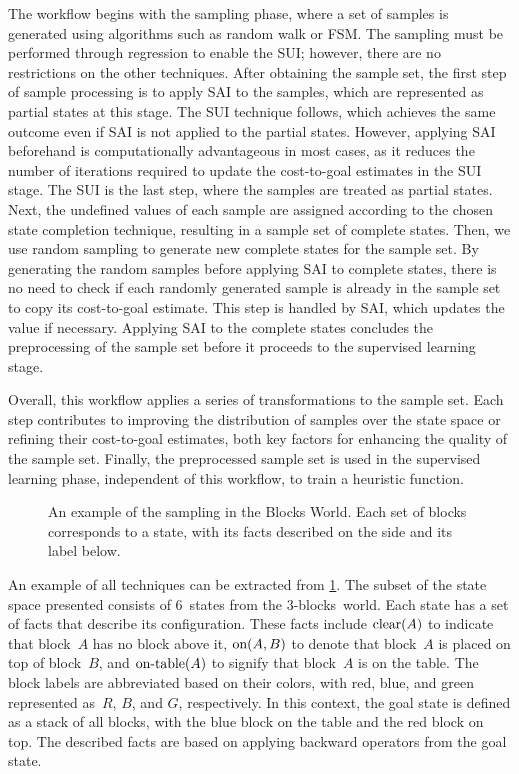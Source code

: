 The workflow begins with the sampling phase, where a set of samples is generated using algorithms such as random walk or FSM. The sampling must be performed through regression to enable the SUI; however, there are no restrictions on the other techniques.
After obtaining the sample set, the first step of sample processing is to apply SAI to the samples, which are represented as partial states at this stage. The SUI technique follows, which achieves the same outcome even if SAI is not applied to the partial states. However, applying SAI beforehand is computationally advantageous in most cases, as it reduces the number of iterations required to update the cost-to-goal estimates in the SUI stage.
The SUI is the last step, where the samples are treated as partial states. Next, the undefined values of each sample are assigned according to the chosen state completion technique, resulting in a sample set of complete states.
Then, we use random sampling to generate new complete states for the sample set. By generating the random samples before applying SAI to complete states, there is no need to check if each randomly generated sample is already in the sample set to copy its cost-to-goal estimate. This step is handled by SAI, which updates the value if necessary. Applying SAI to the complete states concludes the preprocessing of the sample set before it proceeds to the supervised learning stage.

Overall, this workflow applies a series of transformations to the sample set. Each step contributes to improving the distribution of samples over the state space or refining their cost-to-goal estimates, both key factors for enhancing the quality of the sample set. Finally, the preprocessed sample set is used in the supervised learning phase, independent of this workflow, to train a heuristic function.

\begin{figure}[ht]
    \caption[An example of the sampling in the Blocks World.]{An example of the sampling in the Blocks World. Each set of blocks corresponds to a state, with its facts described on the side and its label below.}
    \label{fig:example}
    \addmargin
    \centering
    
\end{figure}

An example of all techniques can be extracted from \cref{fig:example}. The subset of the state space presented consists of $6$~states from the $3$-blocks~world. Each state has a set of facts that describe its configuration. These facts include $\text{clear}(A)$ to indicate that block~$A$ has no block above it, $\text{on}(A,B)$ to denote that block~$A$ is placed on top of block~$B$, and $\text{on-table}(A)$ to signify that block~$A$ is on the table. The block labels are abbreviated based on their colors, with red, blue, and green represented as~$R$, $B$, and $G$, respectively. In this context, the goal state is defined as a stack of all blocks, with the blue block on the table and the red block on top. The described facts are based on applying backward operators from the goal state.

